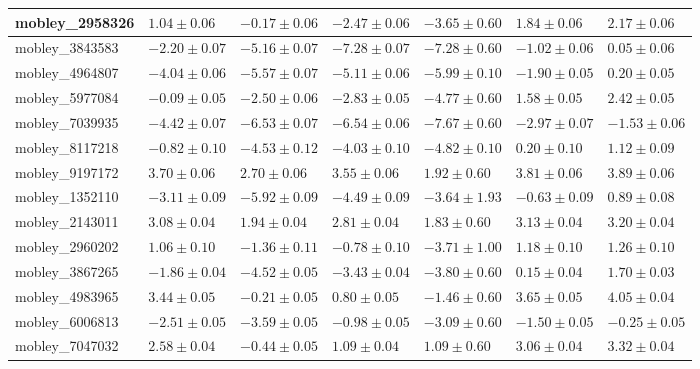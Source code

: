 \documentclass{article}
\begin{document}
\begin{landscape}
\begin{longtable}{|l{3.0cm}|l{3.0cm}|l{3.2cm}|l{3.6cm}|l{3.0cm}|l{3.0cm}|l{3.0cm}|}
mobley\_2958326	&	$	1.04	\pm	0.06	$	&	$	-0.17	\pm	0.06	$	&	$	-2.47	\pm	0.06	$	&	$	-3.65	\pm	0.60	$	&	$	1.84	\pm	0.06	$	&	$	2.17	\pm	0.06	$	\\ \hline
mobley\_3843583	&	$	-2.20	\pm	0.07	$	&	$	-5.16	\pm	0.07	$	&	$	-7.28	\pm	0.07	$	&	$	-7.28	\pm	0.60	$	&	$	-1.02	\pm	0.06	$	&	$	0.05	\pm	0.06	$	\\ \hline
mobley\_4964807	&	$	-4.04	\pm	0.06	$	&	$	-5.57	\pm	0.07	$	&	$	-5.11	\pm	0.06	$	&	$	-5.99	\pm	0.10	$	&	$	-1.90	\pm	0.05	$	&	$	0.20	\pm	0.05	$	\\ \hline
mobley\_5977084	&	$	-0.09	\pm	0.05	$	&	$	-2.50	\pm	0.06	$	&	$	-2.83	\pm	0.05	$	&	$	-4.77	\pm	0.60	$	&	$	1.58	\pm	0.05	$	&	$	2.42	\pm	0.05	$	\\ \hline
mobley\_7039935	&	$	-4.42	\pm	0.07	$	&	$	-6.53	\pm	0.07	$	&	$	-6.54	\pm	0.06	$	&	$	-7.67	\pm	0.60	$	&	$	-2.97	\pm	0.07	$	&	$	-1.53	\pm	0.06	$	\\ \hline
mobley\_8117218	&	$	-0.82	\pm	0.10	$	&	$	-4.53	\pm	0.12	$	&	$	-4.03	\pm	0.10	$	&	$	-4.82	\pm	0.10	$	&	$	0.20	\pm	0.10	$	&	$	1.12	\pm	0.09	$	\\ \hline
mobley\_9197172	&	$	3.70	\pm	0.06	$	&	$	2.70	\pm	0.06	$	&	$	3.55	\pm	0.06	$	&	$	1.92	\pm	0.60	$	&	$	3.81	\pm	0.06	$	&	$	3.89	\pm	0.06	$	\\ \hline
mobley\_1352110	&	$	-3.11	\pm	0.09	$	&	$	-5.92	\pm	0.09	$	&	$	-4.49	\pm	0.09	$	&	$	-3.64	\pm	1.93	$	&	$	-0.63	\pm	0.09	$	&	$	0.89	\pm	0.08	$	\\ \hline
mobley\_2143011	&	$	3.08	\pm	0.04	$	&	$	1.94	\pm	0.04	$	&	$	2.81	\pm	0.04	$	&	$	1.83	\pm	0.60	$	&	$	3.13	\pm	0.04	$	&	$	3.20	\pm	0.04	$	\\ \hline
mobley\_2960202	&	$	1.06	\pm	0.10	$	&	$	-1.36	\pm	0.11	$	&	$	-0.78	\pm	0.10	$	&	$	-3.71	\pm	1.00	$	&	$	1.18	\pm	0.10	$	&	$	1.26	\pm	0.10	$	\\ \hline
mobley\_3867265	&	$	-1.86	\pm	0.04	$	&	$	-4.52	\pm	0.05	$	&	$	-3.43	\pm	0.04	$	&	$	-3.80	\pm	0.60	$	&	$	0.15	\pm	0.04	$	&	$	1.70	\pm	0.03	$	\\ \hline
mobley\_4983965	&	$	3.44	\pm	0.05	$	&	$	-0.21	\pm	0.05	$	&	$	0.80	\pm	0.05	$	&	$	-1.46	\pm	0.60	$	&	$	3.65	\pm	0.05	$	&	$	4.05	\pm	0.04	$	\\ \hline
mobley\_6006813	&	$	-2.51	\pm	0.05	$	&	$	-3.59	\pm	0.05	$	&	$	-0.98	\pm	0.05	$	&	$	-3.09	\pm	0.60	$	&	$	-1.50	\pm	0.05	$	&	$	-0.25	\pm	0.05	$	\\ \hline
mobley\_7047032	&	$	2.58	\pm	0.04	$	&	$	-0.44	\pm	0.05	$	&	$	1.09	\pm	0.04	$	&	$	1.09	\pm	0.60	$	&	$	3.06	\pm	0.04	$	&	$	3.32	\pm	0.04	$	\\ \hline

\end{longtable}
\end{landscape}
\end{document}
